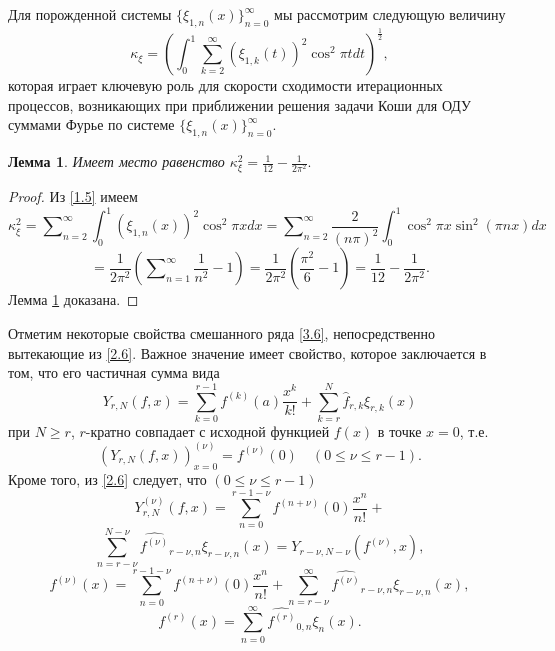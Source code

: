 \documentclass{article}
\numberwithin{equation}{section}
\theoremstyle{plain}
\newtheorem{lemma}{Лемма}[section]
\theoremstyle{definition}
\newtheorem{proof}{Доказательство}\def\theproof{}
\begin{document}
\begin{fulltext}
Для порожденной  системы $\{\xi_{1,n}(x)\}_{n=0}^\infty$ мы рассмотрим следующую величину
\begin{equation}\label{3.12}
\kappa_{\xi}=\left(\int_0^1\sum_{k=2}^{\infty}
(\xi_{1,k}(t))^2\cos^2\pi tdt\right)^{\frac12},
\end{equation}
которая играет ключевую роль для  скорости  сходимости итерационных процессов, возникающих при приближении решения задачи Коши для ОДУ суммами  Фурье по системе $\{\xi_{1,n}(x)\}_{n=0}^\infty$.
\begin{lemma}\label{lem3.2}
  Имеет место равенство
 $
\kappa^2_{\xi}=\frac{1}{12}-\frac{1}{2\pi^2}.
$
\end{lemma}
\begin{proof} Из \eqref{1.5} имеем
 $$
\kappa_{\xi}^2=\sum\nolimits_{n=2}^\infty \int_{0}^1 (\xi_{1,n}(x))^2\cos^2\pi xdx=
\sum\nolimits_{n=2}^\infty\frac{2}{(n\pi)^2} \int_{0}^1\cos^2\pi x \sin^2(\pi nx)dx
$$
$$
=\frac1{2\pi^2}(\sum\nolimits_{n=1}^\infty\frac1{n^2}-1)=\frac1{2\pi^2}(\frac{\pi^2}{6}-1)=
\frac{1}{12}-\frac{1}{2\pi^2}.
 $$
 Лемма \ref{lem3.2}  доказана.
\end{proof}

 Отметим некоторые свойства смешанного ряда \eqref{3.6}, непосредственно вытекающие из \eqref{2.6}. Важное значение имеет свойство, которое заключается в том, что его частичная сумма вида
\begin{equation}\label{3.13}
Y_{r,N}(f,x)=\sum_{k=0}^{r-1} f^{(k)}(a)\frac{x^k}{k!}+ \sum_{k=r}^{N} \hat f_{r,k}\xi_{r,k}(x)
\end{equation}
 при   $N\ge r$, $r$-кратно совпадает с исходной функцией $f(x)$ в точке $x=0$, т.е.
\begin{equation}\label{3.14}
(Y_{r,N}(f,x))^{(\nu)}_{x=0}=f^{(\nu)}(0)\quad (0\le\nu\le r-1).
\end{equation}
Кроме того, из \eqref{2.6}  следует, что $(0\le\nu\le r-1)$
$$
 Y_{r,N}^{(\nu)}(f,x)=\sum_{n=0}^{r-1-\nu} f^{(n+\nu)}(0)\frac{x^n}{n!}+
 $$
\begin{equation}\label{3.15}
  \sum_{n=r-\nu}^{N-\nu} \widehat{f^{(\nu)}}_{r-\nu,n}\xi_{r-\nu,n}(x)=Y_{r-\nu,N-\nu}(f^{(\nu)},x),
 \end{equation}
\begin{equation}\label{3.16}
 f^{(\nu)}(x)=\sum_{n=0}^{r-1-\nu} f^{(n+\nu)}(0)\frac{x^n}{n!}+ \sum_{n=r-\nu}^\infty \widehat{f^{(\nu)}}_{r-\nu,n}\xi_{r-\nu,n}(x),
 \end{equation}
\begin{equation}\label{3.17}
 f^{(r)}(x)=\sum_{n=0}^\infty \widehat{f^{(r)}}_{0,n}\xi_{n}(x).
 \end{equation}


\end{fulltext}
\end{document}
